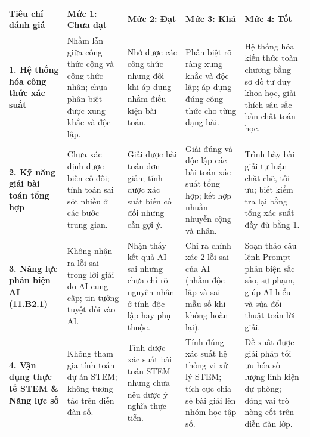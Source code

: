 \documentclass[12pt, a4paper]{article}
\begin{document}
\begin{center}
\small
\begin{tabularx}{\linewidth}{|p{3.2cm}|X|X|X|X|}
\hline
\textbf{Tiêu chí đánh giá} & \textbf{Mức 1: Chưa đạt} & \textbf{Mức 2: Đạt} & \textbf{Mức 3: Khá} & \textbf{Mức 4: Tốt} \\ \hline
\textbf{1. Hệ thống hóa công thức xác suất} & Nhầm lẫn giữa công thức cộng và công thức nhân; chưa phân biệt được xung khắc và độc lập. & Nhớ được các công thức nhưng đôi khi áp dụng nhầm điều kiện bài toán. & Phân biệt rõ ràng xung khắc và độc lập; áp dụng đúng công thức cho từng dạng bài. & Hệ thống hóa kiến thức toàn chương bằng sơ đồ tư duy khoa học, giải thích sâu sắc bản chất toán học. \\ \hline
\textbf{2. Kỹ năng giải bài toán tổng hợp} & Chưa xác định được biến cố đối; tính toán sai sót nhiều ở các bước trung gian. & Giải được bài toán đơn giản; tính được xác suất biến cố đối nhưng cần gợi ý. & Giải đúng và độc lập các bài toán xác suất tổng hợp; kết hợp nhuần nhuyễn cộng và nhân. & Trình bày bài giải tự luận chặt chẽ, tối ưu; biết kiểm tra lại bằng tổng xác suất đầy đủ bằng 1. \\ \hline
\textbf{3. Năng lực phản biện AI (11.B2.1)} & Không nhận ra lỗi sai trong lời giải do AI cung cấp; tin tưởng tuyệt đối vào AI. & Nhận thấy kết quả AI sai nhưng chưa chỉ rõ nguyên nhân ở tính độc lập hay phụ thuộc. & Chỉ ra chính xác 2 lỗi sai của AI (nhầm độc lập và sai mẫu số khi không hoàn lại). & Soạn thảo câu lệnh Prompt phản biện sắc sảo, sư phạm, giúp AI hiểu và sửa đổi thuật toán lời giải. \\ \hline
\textbf{4. Vận dụng thực tế STEM \& Năng lực số} & Không tham gia tính toán dự án STEM; không tương tác trên diễn đàn số. & Tính được xác suất bài toán STEM nhưng chưa nêu được ý nghĩa thực tiễn. & Tính đúng xác suất hệ thống vi xử lý STEM; tích cực chia sẻ bài giải lên nhóm học tập số. & Đề xuất được giải pháp tối ưu hóa số lượng linh kiện dự phòng; đóng vai trò nòng cốt trên diễn đàn lớp. \\ \hline
\end{tabularx}
\end{center}
\end{document}
